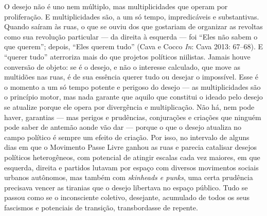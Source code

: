 O desejo não é uno nem múltiplo, mas
multiplicidades que operam por proliferação. E multiplicidades são, a um
só tempo, impredicáveis e substantivas. Quando saíram às ruas, o que se
ouviu dos que gostariam de organizar as revoltas como sua revolução
particular --- da direita à esquerda --- foi ``Eles não sabem o que
querem''; depois, ``Eles querem tudo'' (Cava e Cocco \emph{In}: Cava
2013: 67--68). E ``querer tudo'' aterroriza mais do que projetos
políticos niilistas. Jamais houve conversão de objeto: se é o desejo, e
não o interesse calculado, que move as multidões nas ruas, é de sua
essência querer tudo ou desejar o impossível. Esse é o momento a um só
tempo potente e perigoso do desejo --- as multiplicidades são o princípio
motor, mas nada garante que aquilo que constitui o ideado pelo desejo se
atualize porque ele opera por divergência e multiplicação. Não há, nem
pode haver, garantias --- mas perigos e prudências, conjurações e
criações que ninguém pode saber de antemão aonde vão dar --- porque o que
o desejo atualiza no campo político é sempre um efeito de criação. Por
isso, no intervalo de alguns dias em que o Movimento Passe Livre ganhou
as ruas e parecia catalisar desejos políticos heterogêneos, com
potencial de atingir escalas cada vez maiores, em que esquerda, direita
e partidos lutavam por espaço com diversos movimentos sociais urbanos
autônomos, mas também com \emph{skinheads e punks}, uma certa prudência
precisava vencer as tiranias que o desejo libertava no espaço público.
Tudo se passou como se o inconsciente coletivo, desejante, acumulado de
todos os seus fascismos e potenciais de transição, transbordasse de
repente.

